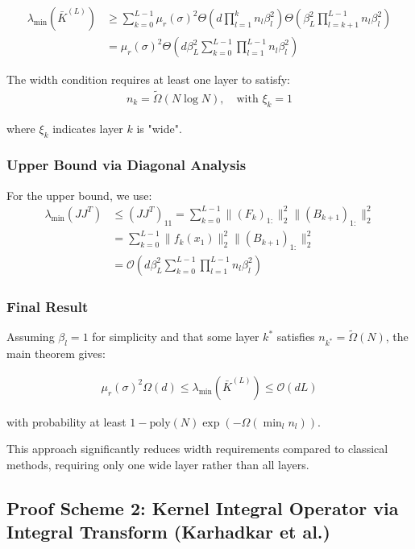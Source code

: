 \documentclass{article}
\newcommand{\evmin}[1]{\lambda_{\min}\left(#1\right)}
\begin{document}
\begin{align}
\evmin{\bar{K}^{(L)}} &\geq \sum_{k=0}^{L-1} \mu_r(\sigma)^2 \Theta\left(d \prod_{l=1}^k n_l \beta_l^2\right) \Theta\left(\beta_L^2 \prod_{l=k+1}^{L-1} n_l \beta_l^2\right) \\
&= \mu_r(\sigma)^2 \Theta\left(d \beta_L^2 \sum_{k=0}^{L-1} \prod_{l=1}^{L-1} n_l \beta_l^2\right)
\end{align}

The width condition requires at least one layer to satisfy:
\begin{align}
n_k = \tilde{\Omega}(N \log N), \quad \text{with } \xi_k = 1
\end{align}

where $\xi_k$ indicates layer $k$ is "wide".

\subsubsection{Upper Bound via Diagonal Analysis}

For the upper bound, we use:
\begin{align}
\evmin{JJ^T} &\leq (JJ^T)_{11} = \sum_{k=0}^{L-1} \|(F_k)_{1:}\|_2^2 \|(B_{k+1})_{1:}\|_2^2 \\
&= \sum_{k=0}^{L-1} \|f_k(x_1)\|_2^2 \|(B_{k+1})_{1:}\|_2^2 \\
&= \mathcal{O}\left(d \beta_L^2 \sum_{k=0}^{L-1} \prod_{l=1}^{L-1} n_l \beta_l^2\right)
\end{align}

\subsubsection{Final Result}

Assuming $\beta_l = 1$ for simplicity and that some layer $k^*$ satisfies $n_{k^*} = \tilde{\Omega}(N)$, the main theorem gives:

\begin{align}
\mu_r(\sigma)^2 \Omega(d) \leq \evmin{\bar{K}^{(L)}} \leq \mathcal{O}(d L)
\end{align}

with probability at least $1 - \text{poly}(N) \exp(-\Omega(\min_l n_l))$.

This approach significantly reduces width requirements compared to classical methods, requiring only one wide layer rather than all layers.

\subsection{Proof Scheme 2: Kernel Integral Operator via Integral Transform (Karhadkar et al.)}
\end{document}
